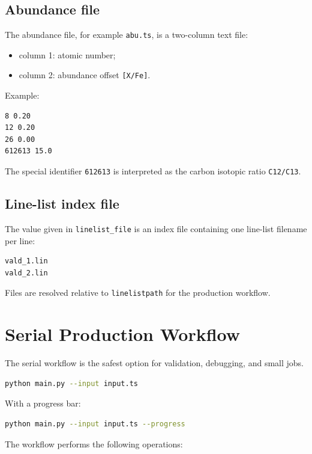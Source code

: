 \documentclass[11pt,a4paper]{article}
\newcommand{\code}[1]{\texttt{#1}}
\begin{document}
\subsection{Abundance file}

The abundance file, for example \code{abu.ts}, is a two-column text file:

\begin{itemize}
  \item column 1: atomic number;
  \item column 2: abundance offset \code{[X/Fe]}.
\end{itemize}

Example:

\begin{lstlisting}
8 0.20
12 0.20
26 0.00
612613 15.0
\end{lstlisting}

The special identifier \code{612613} is interpreted as the carbon isotopic ratio \code{C12/C13}.

\subsection{Line-list index file}

The value given in \code{linelist\_file} is an index file containing one line-list filename per line:

\begin{lstlisting}
vald_1.lin
vald_2.lin
\end{lstlisting}

Files are resolved relative to \code{linelistpath} for the production workflow.

\section{Serial Production Workflow}

The serial workflow is the safest option for validation, debugging, and small jobs.

\begin{lstlisting}[language=bash]
python main.py --input input.ts
\end{lstlisting}

With a progress bar:

\begin{lstlisting}[language=bash]
python main.py --input input.ts --progress
\end{lstlisting}

The workflow performs the following operations:
\end{document}
